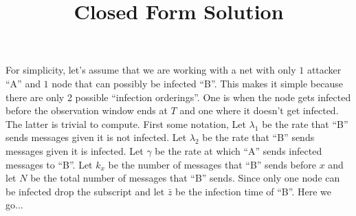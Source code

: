 \documentclass{article}
\begin{document}
\title{Closed Form Solution}
\maketitle

For simplicity, let's assume that we are working with a net with only $1$ attacker ``A'' and $1$ node that can possibly be infected ``B''.  This makes it simple because there are only 2 possible ``infection orderings''.  One is when the node gets infected before the observation window ends at $T$ and one where it doesn't get infected.  The latter is trivial to compute.  First some notation, Let $\lambda_1$ be the rate that ``B'' sends messages given it is not infected.  Let $\lambda_2$ be the rate that ``B'' sends messages given it is infected.  Let $\gamma$ be the rate at which ``A'' sends infected messages to ``B''.  Let $k_{x}$ be the number of messages that ``B'' sends before $x$  and let $N$ be the total number of messages that ``B'' sends.  Since only one node can be infected drop the subscript and let $\bar{z}$ be the infection time of ``B''. Here we go...
 
\end{document}
